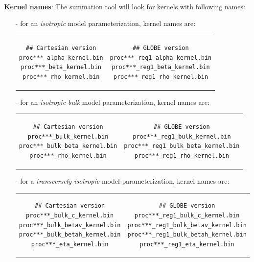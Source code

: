 \noindent
{\bf Kernel names}: The summation tool will look for kernels with following names:
\begin{itemize}
\item [-] for an {\it isotropic} model parameterization, kernel names are:\newline
\begin{tabular}{ c c }
\begin{minipage}{3in}
\begin{verbatim}
## Cartesian version
proc***_alpha_kernel.bin
proc***_beta_kernel.bin
proc***_rho_kernel.bin
\end{verbatim}
\end{minipage}
&
\begin{minipage}{3in}
\begin{verbatim}
## GLOBE version
proc***_reg1_alpha_kernel.bin
proc***_reg1_beta_kernel.bin
proc***_reg1_rho_kernel.bin
\end{verbatim}
\end{minipage}
\end{tabular}\newline

\item [-] for an {\it isotropic bulk} model parameterization, kernel names are:\newline
\begin{tabular}{ c c }
\begin{minipage}{3in}
\begin{verbatim}
## Cartesian version
proc***_bulk_kernel.bin
proc***_bulk_beta_kernel.bin
proc***_rho_kernel.bin
\end{verbatim}
\end{minipage}
&
\begin{minipage}{3in}
\begin{verbatim}
## GLOBE version
proc***_reg1_bulk_kernel.bin
proc***_reg1_bulk_beta_kernel.bin
proc***_reg1_rho_kernel.bin
\end{verbatim}
\end{minipage}
\end{tabular}\newline

\item [-] for a {\it transversely isotropic} model parameterization, kernel names are:\newline
\begin{tabular}{ c c }
\begin{minipage}{3in}
\begin{verbatim}
## Cartesian version
proc***_bulk_c_kernel.bin
proc***_bulk_betav_kernel.bin
proc***_bulk_betah_kernel.bin
proc***_eta_kernel.bin
\end{verbatim}
\end{minipage}
&
\begin{minipage}{3in}
\begin{verbatim}
## GLOBE version
proc***_reg1_bulk_c_kernel.bin
proc***_reg1_bulk_betav_kernel.bin
proc***_reg1_bulk_betah_kernel.bin
proc***_reg1_eta_kernel.bin
\end{verbatim}
\end{minipage}
\end{tabular}\newline


\end{itemize}

